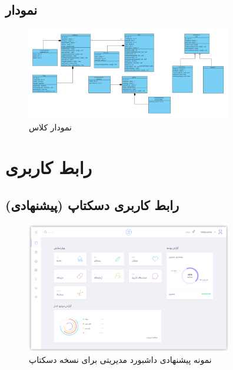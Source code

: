 \documentclass[a4paper,12pt]{report}
\begin{document}
	\section{
		نمودار 
		}\label{sec3:chap2}

	\begin{figure}[!h]
		\label{fig1:sec3:chap2}
		\begin{center}
			\includegraphics[width=0.8\textwidth]{diagrams/classDiagram.pdf}
			\caption{نمودار کلاس}
		\end{center}
	\end{figure}

	\chapter{
		رابط کاربری}
	\label{chp3}
	\section{
	رابط کاربری دسکتاپ (پیشنهادی)
	}\label{sec1:chap3}

	\begin{figure}[!h]
		\label{fig1:sec1:chap3}
		\begin{center}
			\includegraphics[width=0.8\textwidth]{UI/Desktop-UI.pdf}
			\caption{
			نمونه پیشنهادی  داشبورد مدیریتی برای نسخه دسکتاپ
			}
		\end{center}
	\end{figure}
\end{document}
